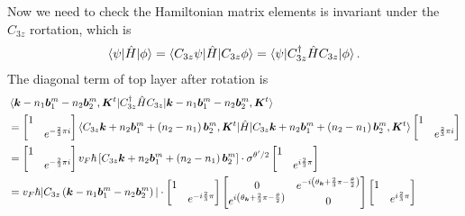 \documentclass[10pt, oneside]{article}
\newcommand{\te}{\theta}
\newcommand{\p}[1]{\left(#1\right)}
\newcommand{\bb}[1]{\left[#1\right]}
\begin{document}
Now we need to check the Hamiltonian matrix elements is invariant under the \(C_{3z}\) rortation, which is 
\begin{align}
	\braket{\psi|\hat{H}|\phi} = \braket{C_{3z} \psi | \hat{H} | C_{3z}  \phi} = \braket{\psi| C^{\dagger}_{3z} \hat{H} C_{3z} | \phi}.
\end{align}
The diagonal term of top layer after rotation is
\begin{align}
	\begin{split}
		& \braket{\bm{k} -n_{1} \bm{b}^{m}_{1} - n_{2} \bm{b}^{m}_{2}, \bm{K}^{t}|C^{\dagger}_{3z} \hat{H} C_{3z}|\bm{k} -n_{1} \bm{b}^{m}_{1} - n_{2} \bm{b}^{m}_{2}, \bm{K}^{t}} \\
		& =  \begin{bmatrix}
			1 & \\ 
			 & e^{ - \frac{2}{3} \pi i}
		\end{bmatrix} \braket{C_{3z}\bm{k} + n_{2} \bm{b}^{m}_{1} + \p{n_{2} - n_{1}} \bm{b}^{m}_{2}, \bm{K}^{t}| \hat{H} |C_{3z} \bm{k} + n_{2} \bm{b}^{m}_{1} + \p{n_{2} - n_{1} }\bm{b}^{m}_{2}, \bm{K}^{t}}  \begin{bmatrix}
			1 & \\ 
			 & e^{\frac{2}{3} \pi i}
		\end{bmatrix} \\
		& = \begin{bmatrix}
			1 & \\ 
			 & e^{ - \frac{2}{3} \pi i}
		\end{bmatrix} v_{F} \hbar \bb{C_{3z} \bm{k} + n_{2} \bm{b}^{m}_{1} + \p{n_{2} - n_{1} }\bm{b}^{m}_{2}} \cdot \sigma^{\te^\prime/2} \begin{bmatrix}
			1 & \\ 
			 & e^{i \frac{2}{3} \pi}
		\end{bmatrix} \\
		& = v_{F} \hbar |C_{3z} \p{\bm{k} - n_{1} \bm{b}^{m}_{1} - n_{2} \bm{b}^{m}_{2}} | \cdot \begin{bmatrix}
			1 & \\ 
			 & e^{ - i \frac{2}{3} \pi }
		\end{bmatrix} \begin{bmatrix}
			0 & e^{-i \p{\te_{\bm{k}} + \frac{2}{3}\pi - \frac{\te}{2}}} \\
			e^{i \p{\te_{\bm{k}} + \frac{2}{3}\pi - \frac{\te}{2}}} & 0
		\end{bmatrix} \begin{bmatrix}
			1 & \\ 
			 & e^{i \frac{2}{3} \pi}
		\end{bmatrix} \\

\end{split}
\end{align}
\end{document}
